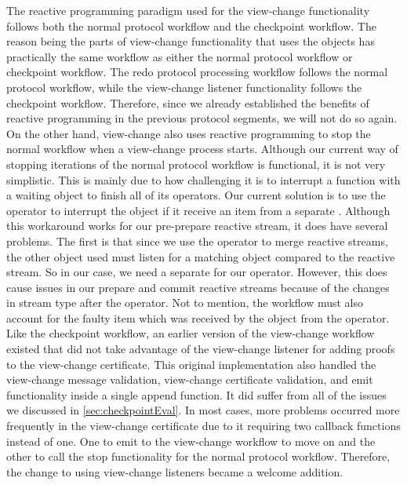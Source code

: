 The reactive programming paradigm used for the view-change functionality follows both the normal protocol workflow and the checkpoint workflow. The reason being the parts of view-change functionality that uses the  objects has practically the same workflow as either the normal protocol workflow or checkpoint workflow. The redo protocol processing workflow follows the normal protocol workflow, while the view-change listener functionality follows the checkpoint workflow. Therefore, since we already established the benefits of reactive programming in the previous protocol segments, we will not do so again. On the other hand, view-change also uses reactive programming to stop the normal workflow when a view-change process starts. Although our current way of stopping iterations of the normal protocol workflow is functional, it is not very simplistic.  This is mainly due to how challenging it is to interrupt a function with a waiting  object to finish all of its operators. Our current solution is to use the  operator to interrupt the  object if it receive an item from a separate . Although this workaround works for our pre-prepare reactive stream, it does have several problems. The first is that since we use the  operator to merge reactive streams, the other  object used must listen for a matching object compared to the reactive stream. So in our case, we need a separate  for our  operator. However, this does cause issues in our prepare and commit reactive streams because of the changes in stream type after the  operator. Not to mention, the workflow must also account for the faulty item which was received by the  object from the  operator. Like the checkpoint workflow, an earlier version of the view-change workflow existed that did not take advantage of the view-change listener for adding proofs to the view-change certificate. This original implementation also handled the view-change message validation, view-change certificate validation, and emit functionality inside a single append function. It did suffer from all of the issues we discussed in \autoref{sec:checkpointEval}. In most cases, more problems occurred more frequently in the view-change certificate due to it requiring two callback functions instead of one. One to emit to the view-change workflow to move on and the other to call the stop functionality for the normal protocol workflow. Therefore, the change to using view-change listeners became a welcome addition.


